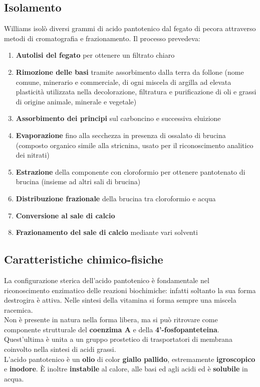 \documentclass[a4paper, 12pt]{article}
\begin{document}
\subsection{Isolamento}
Williams isolò diversi grammi di acido pantotenico dal fegato di pecora attraverso metodi di cromatografia e frazionamento.
Il processo prevedeva:
\begin{enumerate}
\item \textbf{Autolisi del fegato} per ottenere un filtrato chiaro
\item \textbf{Rimozione delle basi} tramite assorbimento dalla terra da follone (nome comune, minerario e commerciale, di ogni miscela di argilla ad elevata plasticità utilizzata nella decolorazione, filtratura e purificazione di oli e grassi di origine animale, minerale e vegetale)
\item \textbf{Assorbimento dei principi} sul carboncino e successiva eluizione
\item \textbf{Evaporazione} fino alla secchezza in presenza di ossalato di brucina (composto organico simile alla stricnina, usato per il riconoscimento analitico dei nitrati)
\item \textbf{Estrazione} della componente con cloroformio per ottenere pantotenato di brucina (insieme ad altri sali di brucina)
\item \textbf{Distribuzione frazionale} della brucina tra cloroformio e acqua
\item \textbf{Conversione al sale di calcio}
\item \textbf{Frazionamento del sale di calcio} mediante vari solventi
\end{enumerate}

\subsection{Caratteristiche chimico-fisiche}
La configurazione sterica dell'acido pantotenico è fondamentale nel riconoscimento enzimatico delle reazioni biochimiche: infatti soltanto la sua forma destrogira è attiva. Nelle sintesi della vitamina si forma sempre una miscela racemica.\\
Non è presente in natura nella forma libera, ma si può ritrovare come componente strutturale del \textbf{coenzima A} e della \textbf{4'-fosfopanteteina}. Quest’ultima è unita a un gruppo prostetico di trasportatori di membrana coinvolto nella sintesi di acidi grassi.\\
L’acido pantotenico è un \textbf{olio} di color \textbf{giallo pallido}, estremamente \textbf{igroscopico} e \textbf{inodore}.
È inoltre \textbf{instabile} al calore, alle basi ed agli acidi ed è \textbf{solubile} in acqua.
\end{document}
